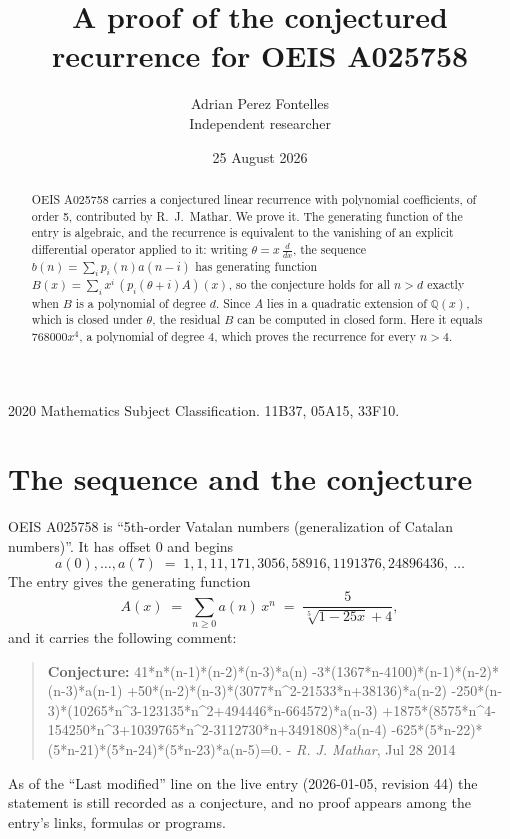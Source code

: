 \documentclass[11pt,a4paper]{article}
\title{A proof of the conjectured recurrence for OEIS A025758}
\author{Adrian Perez Fontelles\\ \small Independent researcher}
\date{25 August 2026}
\theoremstyle{plain}
\theoremstyle{definition}
\begin{document}
\maketitle

\begin{abstract}
OEIS A025758 carries a conjectured linear recurrence with polynomial coefficients, of
order 5, contributed by R.~J.~Mathar. We prove it. The generating function of the
entry is algebraic, and the recurrence is equivalent to the vanishing of an explicit
differential operator applied to it: writing $\theta=x\,\frac{d}{dx}$, the sequence
$b(n)=\sum_{i}p_{i}(n)a(n-i)$ has generating function
$B(x)=\sum_{i}x^{i}\,(p_{i}(\theta+i)A)(x)$, so the conjecture holds for all $n>d$ exactly
when $B$ is a polynomial of degree $d$. Since $A$ lies in a quadratic extension of
$\mathbb{Q}(x)$, which is closed under $\theta$, the residual $B$ can be computed in
closed form. Here it equals $768000 x^{4}$, a polynomial of degree $4$, which proves
the recurrence for every $n>4$.
\end{abstract}

\noindent\small 2020 Mathematics Subject Classification. 11B37, 05A15, 33F10.\normalsize

\section{The sequence and the conjecture}

OEIS A025758 is ``5th-order Vatalan numbers (generalization of Catalan numbers)''. It has offset $0$ and begins
\[
a(0),\dots,a(7)\;=\;1, 1, 11, 171, 3056, 58916, 1191376, 24896436,\ \dots
\]
The entry gives the generating function
\begin{equation}\label{eq:gf}
A(x)\;=\;\sum_{n\ge 0} a(n)\,x^{n}\;=\;\frac{5}{\sqrt[5]{1 - 25 x} + 4} ,
\end{equation}
and it carries the following comment:
\begin{quote}\small
\textbf{Conjecture:} 41*n*(n-1)*(n-2)*(n-3)*a(n) -3*(1367*n-4100)*(n-1)*(n-2)*(n-3)*a(n-1) +50*(n-2)*(n-3)*(3077*n\^{}2-21533*n+38136)*a(n-2) -250*(n-3)*(10265*n\^{}3-123135*n\^{}2+494446*n-664572)*a(n-3) +1875*(8575*n\^{}4-154250*n\^{}3+1039765*n\^{}2-3112730*n+3491808)*a(n-4) -625*(5*n-22)*(5*n-21)*(5*n-24)*(5*n-23)*a(n-5)=0. - \emph{R. J. Mathar}, Jul 28 2014
\end{quote}
As of the ``Last modified'' line on the live entry (2026-01-05, revision 44) the
statement is still recorded as a conjecture, and no proof appears among the entry's links,
formulas or programs.
\end{document}
